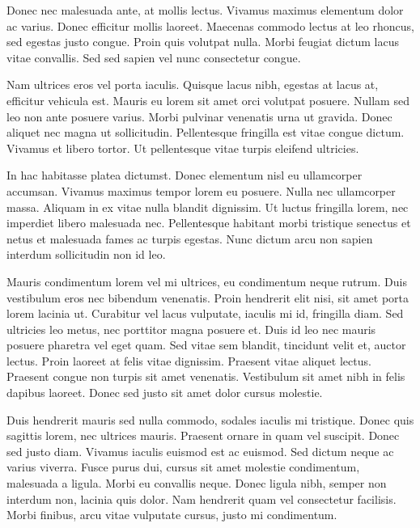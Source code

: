 Donec nec malesuada ante, at mollis lectus. Vivamus maximus elementum dolor ac varius. Donec efficitur mollis laoreet. Maecenas commodo lectus at leo rhoncus, sed egestas justo congue. Proin quis volutpat nulla. Morbi feugiat dictum lacus vitae convallis. Sed sed sapien vel nunc consectetur congue.

Nam ultrices eros vel porta iaculis. Quisque lacus nibh, egestas at lacus at, efficitur vehicula est. Mauris eu lorem sit amet orci volutpat posuere. Nullam sed leo non ante posuere varius. Morbi pulvinar venenatis urna ut gravida. Donec aliquet nec magna ut sollicitudin. Pellentesque fringilla est vitae congue dictum. Vivamus et libero tortor. Ut pellentesque vitae turpis eleifend ultricies.

In hac habitasse platea dictumst. Donec elementum nisl eu ullamcorper accumsan. Vivamus maximus tempor lorem eu posuere. Nulla nec ullamcorper massa. Aliquam in ex vitae nulla blandit dignissim. Ut luctus fringilla lorem, nec imperdiet libero malesuada nec. Pellentesque habitant morbi tristique senectus et netus et malesuada fames ac turpis egestas. Nunc dictum arcu non sapien interdum sollicitudin non id leo.

Mauris condimentum lorem vel mi ultrices, eu condimentum neque rutrum. Duis vestibulum eros nec bibendum venenatis. Proin hendrerit elit nisi, sit amet porta lorem lacinia ut. Curabitur vel lacus vulputate, iaculis mi id, fringilla diam. Sed ultricies leo metus, nec porttitor magna posuere et. Duis id leo nec mauris posuere pharetra vel eget quam. Sed vitae sem blandit, tincidunt velit et, auctor lectus. Proin laoreet at felis vitae dignissim. Praesent vitae aliquet lectus. Praesent congue non turpis sit amet venenatis. Vestibulum sit amet nibh in felis dapibus laoreet. Donec sed justo sit amet dolor cursus molestie.

Duis hendrerit mauris sed nulla commodo, sodales iaculis mi tristique. Donec quis sagittis lorem, nec ultrices mauris. Praesent ornare in quam vel suscipit. Donec sed justo diam. Vivamus iaculis euismod est ac euismod. Sed dictum neque ac varius viverra. Fusce purus dui, cursus sit amet molestie condimentum, malesuada a ligula. Morbi eu convallis neque. Donec ligula nibh, semper non interdum non, lacinia quis dolor. Nam hendrerit quam vel consectetur facilisis. Morbi finibus, arcu vitae vulputate cursus, justo mi condimentum. 
